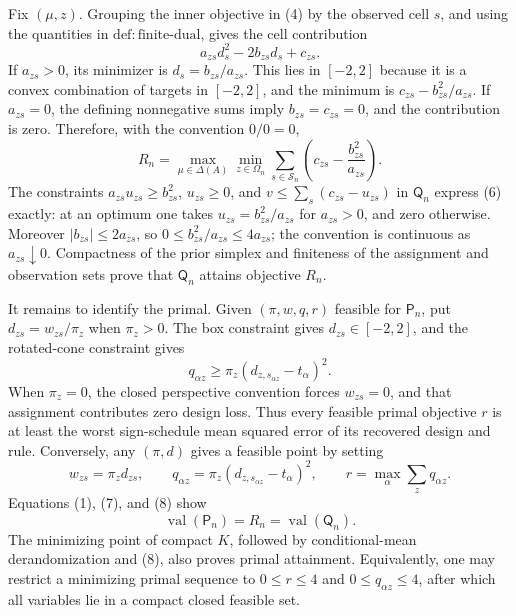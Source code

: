 Fix \((\mu,z)\).  Grouping the inner objective in (4) by the observed cell \(s\), and using the quantities in \(\mathrm{def{:}finite\text{-}dual}\), gives the cell contribution
\[
 a_{zs}d_s^2-2b_{zs}d_s+c_{zs}. \tag{5}
\]
If \(a_{zs}>0\), its minimizer is \(d_s=b_{zs}/a_{zs}\).  This lies in \([-2,2]\) because it is a convex combination of targets in \([-2,2]\), and the minimum is \(c_{zs}-b_{zs}^2/a_{zs}\).  If \(a_{zs}=0\), the defining nonnegative sums imply \(b_{zs}=c_{zs}=0\), and the contribution is zero.  Therefore, with the convention \(0/0=0\),
\[
 R_n=\max_{\mu\in\Delta(A)}\min_{z\in\Omega_n}
 \sum_{s\in\mathcal S_n}
 \left(c_{zs}-\frac{b_{zs}^2}{a_{zs}}\right). \tag{6}
\]
The constraints \(a_{zs}u_{zs}\ge b_{zs}^2\), \(u_{zs}\ge0\), and
\(v\le\sum_s(c_{zs}-u_{zs})\) in \(\mathsf Q_n\) express (6) exactly: at an optimum one takes \(u_{zs}=b_{zs}^2/a_{zs}\) for \(a_{zs}>0\), and zero otherwise.  Moreover \(|b_{zs}|\le2a_{zs}\), so \(0\le b_{zs}^2/a_{zs}\le4a_{zs}\); the convention is continuous as \(a_{zs}\downarrow0\).  Compactness of the prior simplex and finiteness of the assignment and observation sets prove that \(\mathsf Q_n\) attains objective \(R_n\).

It remains to identify the primal.  Given \((\pi,w,q,r)\) feasible for \(\mathsf P_n\), put
\(d_{zs}=w_{zs}/\pi_z\) when \(\pi_z>0\).  The box constraint gives \(d_{zs}\in[-2,2]\), and the rotated-cone constraint gives
\[
 q_{\alpha z}\ge
 \pi_z(d_{z,s_{\alpha z}}-t_\alpha)^2. \tag{7}
\]
When \(\pi_z=0\), the closed perspective convention forces \(w_{zs}=0\), and that assignment contributes zero design loss.  Thus every feasible primal objective \(r\) is at least the worst sign-schedule mean squared error of its recovered design and rule.  Conversely, any \((\pi,d)\) gives a feasible point by setting
\[
 w_{zs}=\pi_zd_{zs},\qquad
 q_{\alpha z}=\pi_z(d_{z,s_{\alpha z}}-t_\alpha)^2,
 \qquad
 r=\max_\alpha\sum_zq_{\alpha z}. \tag{8}
\]
Equations (1), (7), and (8) show
\[
 \operatorname{val}(\mathsf P_n)=R_n
 =\operatorname{val}(\mathsf Q_n). \tag{9}
\]
The minimizing point of compact \(K\), followed by conditional-mean derandomization and (8), also proves primal attainment.  Equivalently, one may restrict a minimizing primal sequence to \(0\le r\le4\) and \(0\le q_{\alpha z}\le4\), after which all variables lie in a compact closed feasible set.

